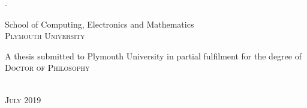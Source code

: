 \begin{titlingpage}
\begin{SingleSpace}
\begin{adjustwidth*}{\unitlength}{-\unitlength}
\begin{center}
\vspace{6mm}
{\large School of Computing, Electronics and Mathematics\\
\textsc{Plymouth University}}\\
\vspace{11mm}
\begin{minipage}{10cm}
A thesis submitted to Plymouth University in partial fulfilment for the degree of \textsc{Doctor of Philosophy}
\end{minipage}\\
\vspace{9mm}
{\large\textsc{July 2019}}
\vspace{12mm}
\end{center}
\begin{flushright}
\end{flushright}
\end{adjustwidth*}
\end{SingleSpace}
\end{titlingpage}